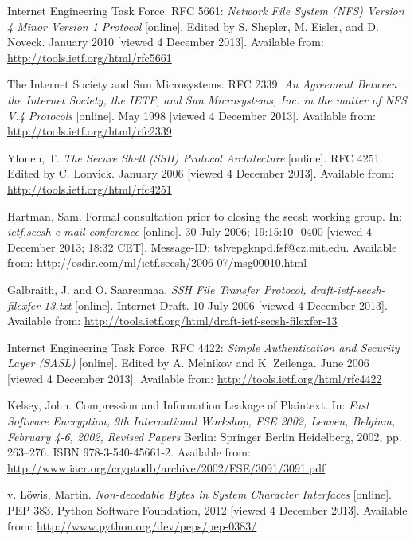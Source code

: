 \begin{thebibliography}{99}
	{\sc Internet Engineering Task Force}.
	RFC 5661:
	\emph{Network File System (NFS) Version 4 Minor Version 1 Protocol}
	[online].
	Edited by S. Shepler, M. Eisler, and D. Noveck.
	January 2010 [viewed 4 December 2013].
	Available from: \url{http://tools.ietf.org/html/rfc5661}

	{\sc The Internet Society} and {\sc Sun Microsystems}.
	RFC 2339:
	\emph{An Agreement Between the Internet Society, the IETF, and Sun Microsystems, Inc. in the matter of NFS V.4 Protocols}
	[online].
	May 1998 [viewed 4 December 2013].
	Available from: \url{http://tools.ietf.org/html/rfc2339}

	{\sc Ylonen,} T.
	\emph{The Secure Shell (SSH) Protocol Architecture}
	[online].
	RFC 4251.
	Edited by C. Lonvick.
	January 2006 [viewed 4 December 2013].
	Available from: \url{http://tools.ietf.org/html/rfc4251}

	{\sc Hartman,} Sam.
	Formal consultation prior to closing the secsh working group.
	In: \emph{ietf.secsh e-mail conference}
	[online].
	30 July 2006; 19:15:10 -0400 [viewed 4 December 2013; 18:32 CET].
	Message-ID: tslvepgknpd.fsf@cz.mit.edu.
	Available from: \url{http://osdir.com/ml/ietf.secsh/2006-07/msg00010.html}

	{\sc Galbraith,} J. and O. {\sc Saarenmaa}.
	\emph{SSH File Transfer Protocol, draft-ietf-secsh-filexfer-13.txt}
	[online].
	Internet-Draft.
	10 July 2006 [viewed 4 December 2013].
	Available from: \url{http://tools.ietf.org/html/draft-ietf-secsh-filexfer-13}


	{\sc Internet Engineering Task Force}.
	RFC 4422:
	\emph{Simple Authentication and Security Layer (SASL)}
	[online].
	Edited by A. Melnikov and K. Zeilenga.
	June 2006 [viewed 4 December 2013].
	Available from: \url{http://tools.ietf.org/html/rfc4422}

	{\sc Kelsey,} John.
	Compression and Information Leakage of Plaintext.
	In: \emph{Fast Software Encryption, 9th International Workshop, FSE 2002,
	Leuven, Belgium, February 4-6, 2002, Revised Papers}
	Berlin: Springer Berlin Heidelberg, 2002, pp. 263--276.
	ISBN 978-3-540-45661-2.
	Available from: \url{http://www.iacr.org/cryptodb/archive/2002/FSE/3091/3091.pdf}

	{\sc v. Löwis,} Martin.
	\emph{Non-decodable Bytes in System Character Interfaces}
	[online].
	PEP 383.
	Python Software Foundation, 2012 [viewed 4 December 2013].
	Available from: \url{http://www.python.org/dev/peps/pep-0383/}


\end{thebibliography}
